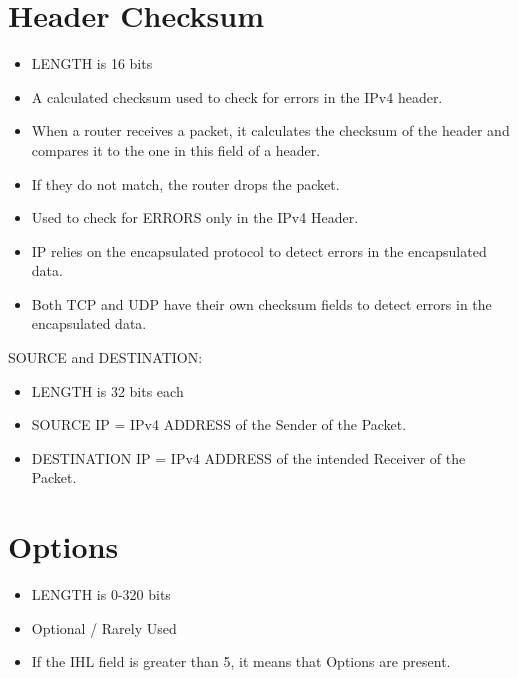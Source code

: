\section{Header Checksum}\label{header-checksum}

\begin{itemize}
\tightlist
\item
  LENGTH is 16 bits
\item
  A calculated checksum used to check for errors in the IPv4 header.
\item
  When a router receives a packet, it calculates the checksum of the
  header and compares it to the one in this field of a header.
\item
  If they do not match, the router drops the packet.
\item
  Used to check for ERRORS only in the IPv4 Header.
\item
  IP relies on the encapsulated protocol to detect errors in the
  encapsulated data.
\item
  Both TCP and UDP have their own checksum fields to detect errors in
  the encapsulated data.
\end{itemize}

SOURCE and DESTINATION:

\begin{itemize}
\tightlist
\item
  LENGTH is 32 bits each
\item
  SOURCE IP = IPv4 ADDRESS of the Sender of the Packet.
\item
  DESTINATION IP = IPv4 ADDRESS of the intended Receiver of the Packet.
\end{itemize}

\section{Options}\label{options}

\begin{itemize}
\tightlist
\item
  LENGTH is 0-320 bits
\item
  Optional / Rarely Used
\item
  If the IHL field is greater than 5, it means that Options are present.
\end{itemize}
